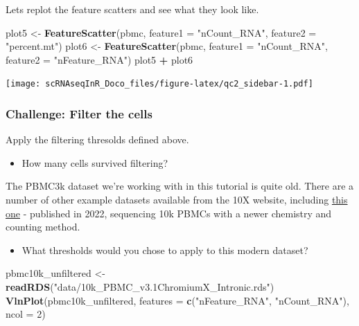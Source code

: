 \documentclass[
]{book}
\newenvironment{Shaded}{\begin{snugshade}}{\end{snugshade}}
\newcommand{\AttributeTok}[1]{\textcolor[rgb]{0.13,0.29,0.53}{#1}}
\newcommand{\DecValTok}[1]{\textcolor[rgb]{0.00,0.00,0.81}{#1}}
\newcommand{\FunctionTok}[1]{\textcolor[rgb]{0.13,0.29,0.53}{\textbf{#1}}}
\newcommand{\NormalTok}[1]{#1}
\newcommand{\OtherTok}[1]{\textcolor[rgb]{0.56,0.35,0.01}{#1}}
\newcommand{\SpecialCharTok}[1]{\textcolor[rgb]{0.81,0.36,0.00}{\textbf{#1}}}
\newcommand{\StringTok}[1]{\textcolor[rgb]{0.31,0.60,0.02}{#1}}
\providecommand{\tightlist}{%
  \setlength{\itemsep}{0pt}\setlength{\parskip}{0pt}}
\begin{document}
Lets replot the feature scatters and see what they look like.

\begin{Shaded}
\begin{Highlighting}[]
\NormalTok{plot5 }\OtherTok{\textless{}{-}} \FunctionTok{FeatureScatter}\NormalTok{(pbmc, }\AttributeTok{feature1 =} \StringTok{"nCount\_RNA"}\NormalTok{, }\AttributeTok{feature2 =} \StringTok{"percent.mt"}\NormalTok{) }
\NormalTok{plot6 }\OtherTok{\textless{}{-}} \FunctionTok{FeatureScatter}\NormalTok{(pbmc, }\AttributeTok{feature1 =} \StringTok{"nCount\_RNA"}\NormalTok{, }\AttributeTok{feature2 =} \StringTok{"nFeature\_RNA"}\NormalTok{) }
\NormalTok{plot5 }\SpecialCharTok{+}\NormalTok{ plot6}
\end{Highlighting}
\end{Shaded}

\texttt{[image: scRNAseqInR\_Doco\_files/figure-latex/qc2\_sidebar-1.pdf]}

\hypertarget{challenge-filter-the-cells}{%
\subsubsection*{Challenge: Filter the cells}\label{challenge-filter-the-cells}}

Apply the filtering thresolds defined above.

\begin{itemize}
\tightlist
\item
  How many cells survived filtering?
\end{itemize}

The PBMC3k dataset we're working with in this tutorial is quite old. There are a number of other example datasets available from the 10X website, including \href{https://www.10xgenomics.com/resources/datasets/10k-human-pbmcs-3-v3-1-chromium-x-with-intronic-reads-3-1-high}{this one} - published in 2022, sequencing 10k PBMCs with a newer chemistry and counting method.

\begin{itemize}
\tightlist
\item
  What thresholds would you chose to apply to this modern dataset?
\end{itemize}

\begin{Shaded}
\begin{Highlighting}[]
\NormalTok{pbmc10k\_unfiltered }\OtherTok{\textless{}{-}} \FunctionTok{readRDS}\NormalTok{(}\StringTok{"data/10k\_PBMC\_v3.1ChromiumX\_Intronic.rds"}\NormalTok{)}
\FunctionTok{VlnPlot}\NormalTok{(pbmc10k\_unfiltered, }\AttributeTok{features =} \FunctionTok{c}\NormalTok{(}\StringTok{"nFeature\_RNA"}\NormalTok{, }\StringTok{"nCount\_RNA"}\NormalTok{), }\AttributeTok{ncol =} \DecValTok{2}\NormalTok{)}
\end{Highlighting}
\end{Shaded}
\end{document}
